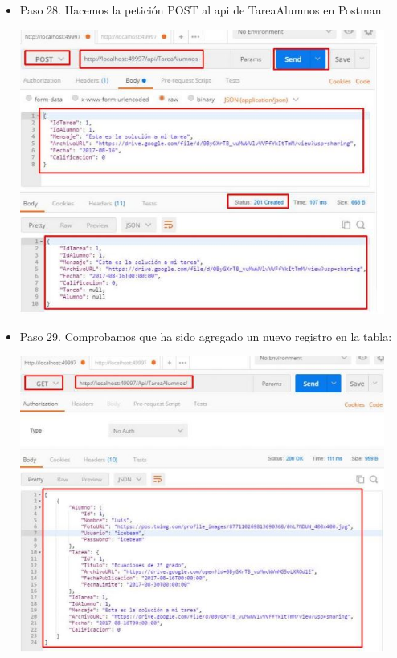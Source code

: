 \begin{flushleft}
\begin{itemize}
\item Paso 28.  Hacemos la petición POST al api de TareaAlumnos en Postman:
\begin{center}
	\includegraphics[width=12cm]{./Imagenes/paso28} 
	\end{center}

\item Paso 29.   Comprobamos que ha sido agregado un nuevo registro en la tabla:
\begin{center}
	\includegraphics[width=12cm]{./Imagenes/paso29} 
	\end{center}

\end{itemize} 


\end{flushleft}